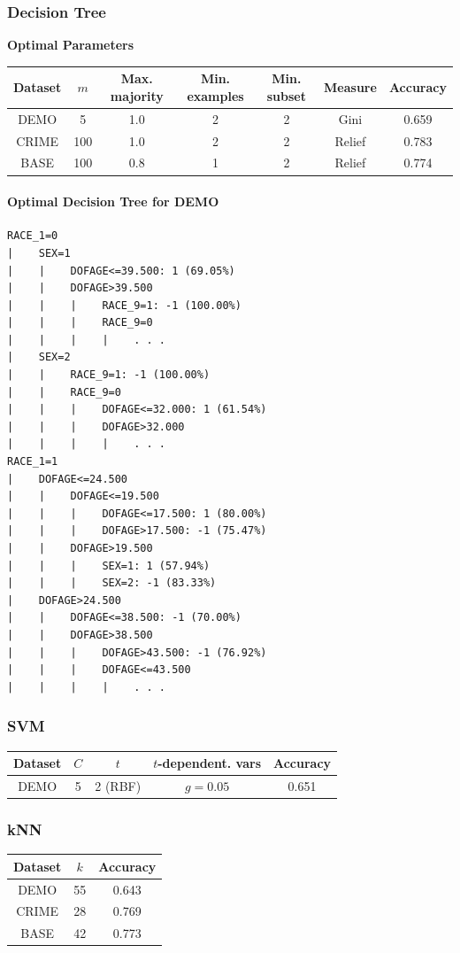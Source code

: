 \documentclass[11pt,letter]{article}
\begin{document}
\subsubsection{Decision Tree}
\textbf{Optimal Parameters}

\begin{tabular}{|c|c|c|c|c|c|c|}
\hline
Dataset & $m$ & Max. majority & Min. examples & Min. subset & Measure & Accuracy \\
\hline
DEMO & 5 & 1.0 & 2 & 2 & Gini & 0.659 \\
CRIME & 100 & 1.0 & 2 & 2 & Relief & 0.783 \\
BASE & 100 & 0.8 & 1 & 2 & Relief & 0.774 \\
\hline
\end{tabular}

\paragraph{Optimal Decision Tree for DEMO} %
\begin{verbatim}
RACE_1=0
|    SEX=1
|    |    DOFAGE<=39.500: 1 (69.05%)
|    |    DOFAGE>39.500
|    |    |    RACE_9=1: -1 (100.00%)
|    |    |    RACE_9=0
|    |    |    |    . . .
|    SEX=2
|    |    RACE_9=1: -1 (100.00%)
|    |    RACE_9=0
|    |    |    DOFAGE<=32.000: 1 (61.54%)
|    |    |    DOFAGE>32.000
|    |    |    |    . . .
RACE_1=1
|    DOFAGE<=24.500
|    |    DOFAGE<=19.500
|    |    |    DOFAGE<=17.500: 1 (80.00%)
|    |    |    DOFAGE>17.500: -1 (75.47%)
|    |    DOFAGE>19.500
|    |    |    SEX=1: 1 (57.94%)
|    |    |    SEX=2: -1 (83.33%)
|    DOFAGE>24.500
|    |    DOFAGE<=38.500: -1 (70.00%)
|    |    DOFAGE>38.500
|    |    |    DOFAGE>43.500: -1 (76.92%)
|    |    |    DOFAGE<=43.500
|    |    |    |    . . .
\end{verbatim}

\subsubsection{SVM}
\begin{tabular}{|c|c|c|c|c|}
\hline
Dataset & $C$ & $t$ & $t$-dependent. vars & Accuracy \\
\hline
DEMO & 5 & 2 (RBF) & $g=0.05$ & 0.651 \\
\hline
\end{tabular}

\subsubsection{kNN}
\begin{tabular}{|c|c|c|}
\hline
Dataset & $k$ & Accuracy \\
\hline
DEMO & 55 & 0.643 \\
CRIME & 28 & 0.769 \\
BASE & 42 & 0.773 \\
\hline
\end{tabular}
\end{document}
